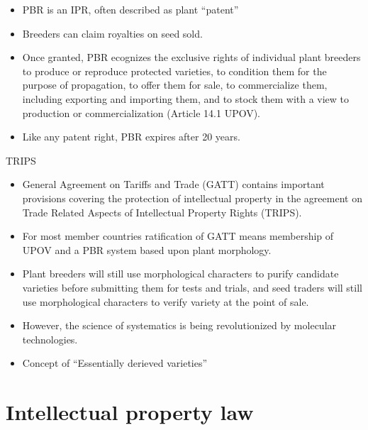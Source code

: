 \documentclass[
  ignorenonframetext,
  aspectratio=169]{beamer}
\providecommand{\tightlist}{%
  \setlength{\itemsep}{0pt}\setlength{\parskip}{0pt}}
\begin{document}
\begin{frame}{}
\protect\hypertarget{section-6}{}
\begin{itemize}
\tightlist
\item
  PBR is an IPR, often described as plant ``patent''
\item
  Breeders can claim royalties on seed sold.
\item
  Once granted, PBR ecognizes the exclusive rights of individual plant
  breeders to produce or reproduce protected varieties, to condition
  them for the purpose of propagation, to offer them for sale, to
  commercialize them, including exporting and importing them, and to
  stock them with a view to production or commercialization (Article
  14.1 UPOV).
\item
  Like any patent right, PBR expires after 20 years.
\end{itemize}
\end{frame}

\begin{frame}{TRIPS}
\protect\hypertarget{trips}{}
\begin{itemize}
\tightlist
\item
  General Agreement on Tariffs and Trade (GATT) contains important
  provisions covering the protection of intellectual property in the
  agreement on Trade Related Aspects of Intellectual Property Rights
  (TRIPS).
\item
  For most member countries ratification of GATT means membership of
  UPOV and a PBR system based upon plant morphology.
\item
  Plant breeders will still use morphological characters to purify
  candidate varieties before submitting them for tests and trials, and
  seed traders will still use morphological characters to verify variety
  at the point of sale.
\item
  However, the science of systematics is being revolutionized by
  molecular technologies.
\item
  Concept of ``Essentially derieved varieties''
\end{itemize}
\end{frame}

\hypertarget{intellectual-property-law}{%
\section{Intellectual property law}\label{intellectual-property-law}}
\end{document}

